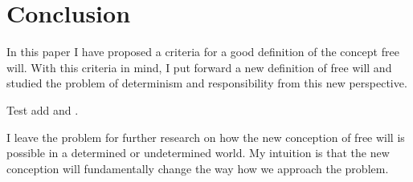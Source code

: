 \section{Conclusion}

In this paper I have proposed a criteria for a good definition of the concept free will. With this criteria in mind, I put forward a new definition of free will and studied the problem of determinism and responsibility from this new perspective.

Test add \cite{sep-moral-responsibility} and \cite{sep-freewill}.

I leave the problem for further research on how the new conception of free will is possible in a determined or undetermined world. My intuition is that the new conception will fundamentally change the way how we approach the problem.
